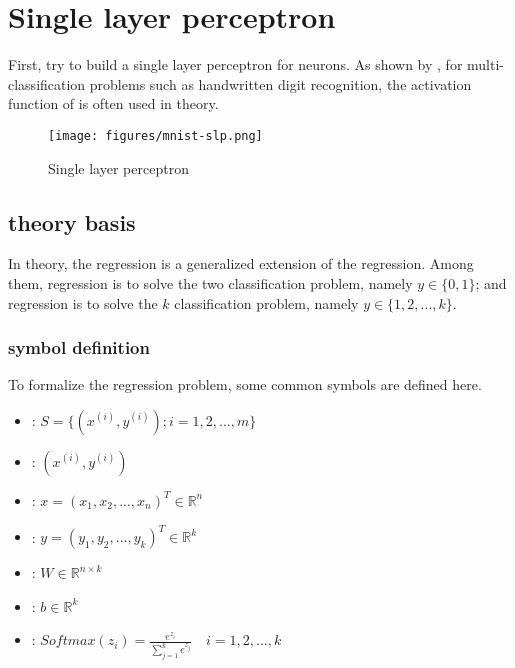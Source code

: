 \section{Single layer perceptron}

\begin{content}

First, try to build a single layer perceptron for  neurons. As shown by , for multi-classification problems such as handwritten digit recognition, the activation function of  is often used in theory.

\begin{figure}[H]
\centering
\texttt{[image: figures/mnist-slp.png]}
\caption{Single layer perceptron}
 \label{fig:mnist-slp}
\end{figure}

\subsection{theory basis}

In theory, the  regression is a generalized extension of the  regression. Among them,  regression is to solve the two classification problem, namely $y \in \{ 0,1\}$; and  regression is to solve the $k $ classification problem, namely $y \in \{ 1,2,...,k\}$.

\subsubsection{symbol definition}

To formalize the  regression problem, some common symbols are defined here.

 \begin{itemize}
   \item {}: $ S = \{ ({x^{(i)}}, {y^{(i)}});i = 1,2,...,m\} $
   \item {}: $ ({x^{(i)}}, {y^{(i)}}) $
   \item {}: $ x = ({x_1},{x_2},...,{x_n})^{T} \in {\mathbb{R}^n} $
   \item {}: $ y = ({y_1},{y_2},...,{y_k})^{T} \in {\mathbb{R}^k} $
   \item {}: $ W \in {\mathbb{R}^{n \times k}} $   
   \item {}: $ b \in {\mathbb{R}^k} $   
   \item {}: $ 
Softmax {(z_i)} = \tfrac{{{e^{{z_i}}}}}{{\sum\limits_{j = 1}^k {{e^{{z_j}}}} }} \quad i = 1,2,...,k
$
 \end{itemize}


\end{content}
